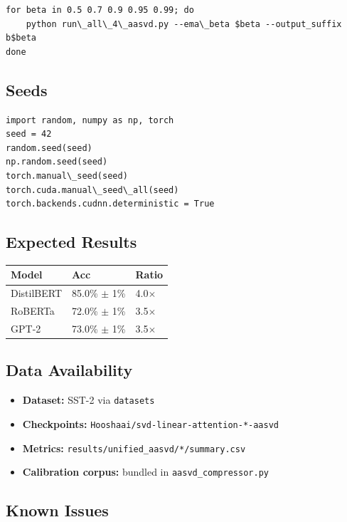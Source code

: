 \begin{lstlisting}
for beta in 0.5 0.7 0.9 0.95 0.99; do
    python run\_all\_4\_aasvd.py --ema\_beta $beta --output_suffix b$beta
done
\end{lstlisting}

\subsection{Seeds}

\begin{lstlisting}
import random, numpy as np, torch
seed = 42
random.seed(seed)
np.random.seed(seed)
torch.manual\_seed(seed)
torch.cuda.manual\_seed\_all(seed)
torch.backends.cudnn.deterministic = True
\end{lstlisting}

\subsection{Expected Results}

\begin{table}[H]
\centering
\small
\begin{tabular}{lll}
\toprule
\textbf{Model} & \textbf{Acc} & \textbf{Ratio} \\
\midrule
DistilBERT & 85.0\% $\pm$ 1\% & 4.0$\times$ \\
RoBERTa & 72.0\% $\pm$ 1\% & 3.5$\times$ \\
GPT-2 & 73.0\% $\pm$ 1\% & 3.5$\times$ \\
\bottomrule
\end{tabular}
\end{table}

\subsection{Data Availability}

\begin{itemize}
\item \textbf{Dataset:} SST-2 via \texttt{datasets}
\item \textbf{Checkpoints:} \texttt{Hooshaai/svd-linear-attention-*-aasvd}
\item \textbf{Metrics:} \texttt{results/unified\_aasvd/*/summary.csv}
\item \textbf{Calibration corpus:} bundled in \texttt{aasvd\_compressor.py}

\end{itemize}
\subsection{Known Issues}

